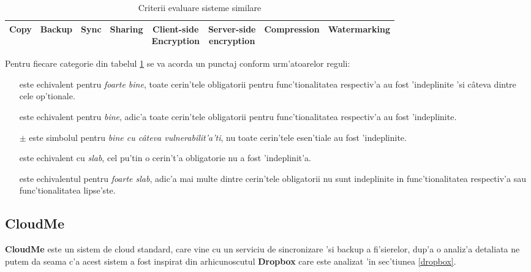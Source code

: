 \documentclass[12pt,a4paper,twoside]{report}
\newcommand{\greencheck}{\color{green}  \ding{51}}
\newcommand{\orangepm}{\color{orange} \textbf{$\pm$}}
\newcommand{\redxmark}{\color{red} \ding{55}}
\begin{document}
\begin{table}[H]
\caption{Criterii evaluare sisteme similare}
\small
\begin{tabular}{|c|c|c|c|c|c|c|c|}   
       
\hline                     
Copy & Backup & Sync & Sharing & \makecell{Client-side \\ Encryption} & \makecell{ Server-side \\ encryption} & Compression & Watermarking  \\ [0.1ex]   
\hline                              
\end{tabular}
\label{table:criteriatable}             
\end{table}

Pentru fiecare categorie din tabelul \ref{table:criteriatable} se va acorda un punctaj conform urm'atoarelor reguli:

\begin{itemize}
\item[\greencheck\greencheck] este echivalent pentru {\it foarte bine}, toate cerin'tele obligatorii pentru func'tionalitatea respectiv'a au fost 'indeplinite 'si câteva dintre cele op'tionale.
\item[\greencheck] este echivalent pentru {\it bine}, adic'a toate cerin'tele obligatorii pentru func'tionalitatea respectiv'a au fost 'indeplinite.
\item[\orangepm] este simbolul pentru {\it bine cu câteva vulnerabilit'a'ti}, nu toate cerin'tele esen'tiale au fost 'indeplinite.
\item[\redxmark] este echivalent cu {\it slab}, cel pu'tin o cerin't'a obligatorie nu a fost 'indeplinit'a.
\item[\redxmark \redxmark] este echivalentul pentru {\it foarte slab}, adic'a mai multe dintre cerin'tele obligatorii nu sunt indeplinite in func'tionalitatea respectiv'a sau func'tionalitatea lipse'ste.
\end{itemize}

\subsection{CloudMe}

\textbf{CloudMe}\cite{cloudme_com} este un sistem de cloud standard, care vine cu un serviciu de sincronizare 'si backup a fi'sierelor, dup'a o analiz'a detaliata ne putem da seama c'a acest sistem a fost inspirat din arhicunoscutul \textbf{Dropbox} care este analizat 'in sec'tiunea \ref{dropbox}. 
\end{document}
